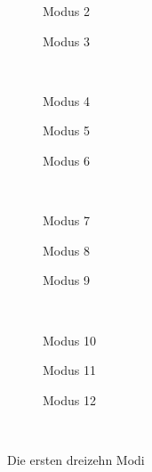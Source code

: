 \documentclass[]{report}
\begin{document}
\begin{enumerate}
\begin{enumerate}
\begin{figure}[tbp!]
\begin{subfigure}{0.3\textwidth}
				
				\caption{Modus 2}
				\label{fig:mode2}
			\end{subfigure}	
			\quad
			\begin{subfigure}{0.3\textwidth}
				\centering
				
				\caption{Modus 3}
				\label{fig:mode3}
			\end{subfigure}	
			\\
			\begin{subfigure}{0.3\textwidth}
				\centering
				
				\caption{Modus 4}
				\label{fig:mode4}
			\end{subfigure}
			\quad
			\begin{subfigure}{0.3\textwidth}
				\centering
				
				\caption{Modus 5}
				\label{fig:mode5}
			\end{subfigure}	
			\quad
			\begin{subfigure}{0.3\textwidth}
				\centering
				
				\caption{Modus 6}
				\label{fig:mode6}
			\end{subfigure}	
			\\
			\begin{subfigure}{0.3\textwidth}
				\centering
				
				\caption{Modus 7}
				\label{fig:mode7}
			\end{subfigure}
			\quad
			\begin{subfigure}{0.3\textwidth}
				\centering
				
				\caption{Modus 8}
				\label{fig:mode8}
			\end{subfigure}	
			\quad
			\begin{subfigure}{0.3\textwidth}
				\centering
				
				\caption{Modus 9}
				\label{fig:mode9}
			\end{subfigure}	
			\\
			\begin{subfigure}{0.3\textwidth}
				\centering
				
				\caption{Modus 10}
				\label{fig:mode10}
			\end{subfigure}
			\quad
			\begin{subfigure}{0.3\textwidth}
				\centering
				
				\caption{Modus 11}
				\label{fig:mode11}
			\end{subfigure}	
			\quad
			\begin{subfigure}{0.3\textwidth}
				\centering
				
				\caption{Modus 12}
				\label{fig:mode12}
			\end{subfigure}	
			\\
			\caption{Die ersten dreizehn Modi}
			\label{fig:modi}
		\end{figure}
		

\end{enumerate}
\end{enumerate}
\end{document}
